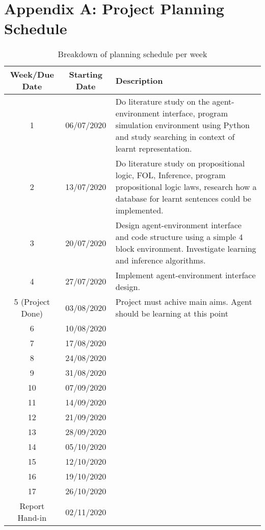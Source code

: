 \setcounter{table}{0}
\renewcommand{\thetable}{A.\arabic{table}}




\chapter{Appendix A:  Project Planning Schedule}

 \begin{table}[H]
  \begin{center}
    \begin{tabular}{|c|c|p{6cm}|} %
    \hline
      \textbf{Week/Due Date} & \textbf{Starting Date} & \textbf{Description}\\
      \hline
      \hline
      
      1 & 06/07/2020 & Do literature study on the agent-environment interface, program simulation 				environment using Python and study searching in context of learnt representation.\\ \hline

      2 & 13/07/2020 & Do literature study on propositional logic, FOL, Inference, program 						propositional logic laws, research how a database for learnt sentences could be implemented.\\ \hline

      3 & 20/07/2020 & Design agent-environment interface and code structure using a simple 4 block environment. Investigate learning and inference algorithms.\\ \hline

      4 & 27/07/2020 & Implement agent-environment interface design. \\ \hline

      5 (Project Done) & 03/08/2020 & Project must achive main aims. Agent should be learning at this point \\ \hline
     
      6 & 10/08/2020 & \\ \hline
      7 & 17/08/2020 & \\ \hline
      8 & 24/08/2020 & \\ \hline
      9 & 31/08/2020 & \\ \hline
      10 & 07/09/2020 &\\ \hline
      11 & 14/09/2020 & \\ \hline
      12 & 21/09/2020 & \\ \hline
      13 & 28/09/2020 & \\ \hline
      14 & 05/10/2020 & \\ \hline
      15 & 12/10/2020 & \\ \hline
      16 & 19/10/2020 & \\ \hline
      17 & 26/10/2020 & \\ \hline
      Report Hand-in & 02/11/2020 & \\
      
      \hline
    \end{tabular}
  \end{center}
  \caption{Breakdown of planning schedule per week}
    \label{tab:tablea1}
\end{table}